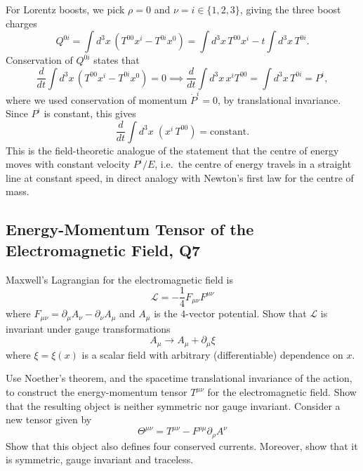 \begin{solution}
    For Lorentz boosts, we pick $\rho = 0$ and $\nu = i \in \{1,2,3\}$, giving the three
    boost charges
    \begin{equation}
        Q^{0i} = \int d^3x\,(T^{00}x^i - T^{0i}x^0) = \int d^3x\, T^{00}x^i - t\int d^3x\, T^{0i}.
    \end{equation}
    Conservation of $Q^{0i}$ states that
    \begin{equation}
        \frac{d}{dt}\int d^3x\,(T^{00}x^i - T^{0i}x^0) = 0 \implies \frac{d}{dt}\int d^3x\, x^i T^{00} = \int d^3x\, T^{0i} = P^i,
    \end{equation}
    where we used conservation of momentum $\dot{P}^i = 0$, by translational invariance. Since $P^i$ is constant, this
    gives
    \begin{equation}
        \frac{d}{dt}\int d^3x\;(x^i\,T^{00}) = \text{constant}.
    \end{equation}
    This is the field-theoretic analogue of the statement that the centre of energy moves with constant velocity $P^i/E$, i.e.\ the centre of energy travels in a straight
    line at constant speed, in direct analogy with Newton's first law for the centre of mass.    
\end{solution}

\subsection{Energy-Momentum Tensor of the Electromagnetic Field, Q7}
Maxwell's Lagrangian for the electromagnetic field is
\begin{equation}
    \mathcal{L} = -\frac{1}{4}F_{\mu\nu}F^{\mu\nu}
\end{equation}
where $F_{\mu\nu} = \partial_\mu A_\nu - \partial_\nu A_\mu$ and $A_\mu$ is the 4-vector potential. Show that $\mathcal{L}$ is invariant under gauge transformations
\begin{equation}
    A_\mu \to A_\mu + \partial_\mu\xi
\end{equation}
where $\xi = \xi(x)$ is a scalar field with arbitrary (differentiable) dependence on $x$.

Use Noether's theorem, and the spacetime translational invariance of the action, to construct the energy-momentum tensor $T^{\mu\nu}$ for the electromagnetic field. Show that the resulting object is neither symmetric nor gauge invariant. Consider a new tensor given by
\begin{equation}
    \Theta^{\mu\nu} = T^{\mu\nu} - F^{\rho\mu}\partial_\rho A^\nu
\end{equation}
Show that this object also defines four conserved currents. Moreover, show that it is symmetric, gauge invariant and traceless.


